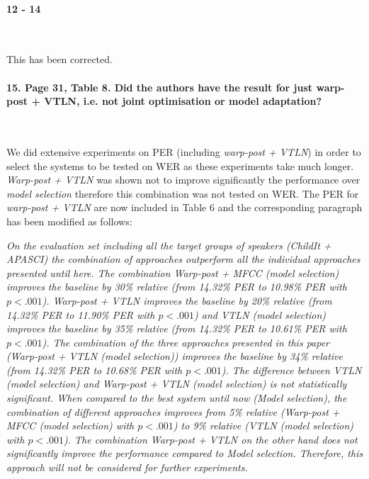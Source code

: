 \documentclass[]{article}
\begin{document}
\paragraph{12 - 14}

~

This has been corrected.

\paragraph{15. Page 31, Table 8. Did the authors have the result for just warp-post + VTLN, i.e. not joint optimisation or model adaptation?}

~

We did extensive experiments on PER (including \textit{warp-post + VTLN}) in order to select the systems to be tested on WER as these experiments take much longer. \textit{Warp-post + VTLN} was shown not to improve significantly the performance over \textit{model selection} therefore this combination was not tested on WER. The PER for \textit{warp-post + VTLN} are now included in Table 6 and the corresponding paragraph has been modified as follows:

\textit{On the evaluation set including all the target groups of speakers (ChildIt + APASCI) the combination of approaches outperform all the individual approaches presented until here. The combination {\em Warp-post + MFCC (model selection)} improves the baseline by 30\% relative (from 14.32\% PER to 10.98\% PER with $p  <.001$).  {\em Warp-post + VTLN} improves the baseline by 20\% relative (from 14.32\% PER to 11.90\% PER with $p  <.001$) and {\em VTLN (model selection)} improves the baseline by 35\% relative (from 14.32\% PER to 10.61\% PER with $p  <.001$). The combination of the three approaches presented in this paper ({\em Warp-post + VTLN (model selection)}) improves the baseline by 34\% relative (from 14.32\% PER to 10.68\% PER with $p  <.001$). The difference between {\em VTLN (model selection)} and {\em Warp-post + VTLN (model selection)} is not statistically significant. When compared to the best system until now ({\em Model selection}), the combination of different approaches improves from 5\% relative ({\em Warp-post + MFCC (model selection)} with $p  <.001$) to 9\% relative ({\em VTLN (model selection)} with $p  <.001$). The combination {\em Warp-post + VTLN} on the other hand does not significantly improve the performance compared to {\em Model selection}. Therefore, this approach will not be considered for further experiments.}
\end{document}
